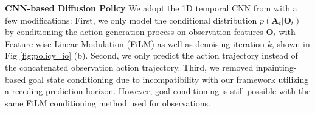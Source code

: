 \textbf{CNN-based Diffusion Policy} 
We adopt the 1D temporal CNN from \citet{pmlr-v162-janner22a} with a few modifications:
%
First, we only model the conditional distribution $p(\mathbf{A}_t|\mathbf{O}_t)$ by conditioning the action generation process on observation features $\mathbf{O}_t$ with Feature-wise Linear Modulation (FiLM) \cite{perez2018film} as well as denoising iteration $k$, shown in Fig \ref{fig:policy_io} (b).
Second, we only predict the action trajectory instead of the concatenated observation action trajectory. 
Third, we removed inpainting-based goal state conditioning due to incompatibility with our framework utilizing a receding prediction horizon. However, goal conditioning is still possible with the same FiLM conditioning method used for observations.

